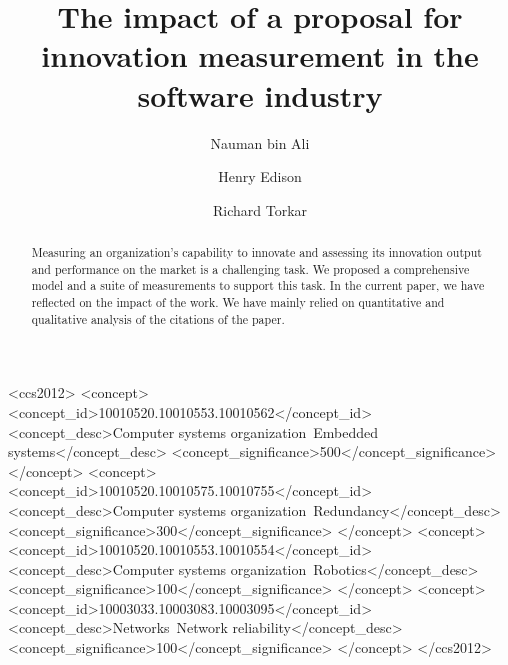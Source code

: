 \documentclass[sigplan]{acmart}
\begin{document}
\title{The impact of a proposal for innovation measurement in the software industry}

\author{Nauman bin Ali}

\author{Henry Edison}

\author{Richard Torkar}


\renewcommand{\shortauthors}{Ali et al.}




\begin{abstract}
Measuring an organization's capability to innovate and assessing its innovation output and performance on the market is a challenging task. We proposed a comprehensive model and a suite of measurements to support this task. In the current paper, we have reflected on the impact of the work. We have mainly relied on quantitative and qualitative analysis of the citations of the paper.  
\end{abstract}

\begin{CCSXML}
<ccs2012>
 <concept>
  <concept_id>10010520.10010553.10010562</concept_id>
  <concept_desc>Computer systems organization~Embedded systems</concept_desc>
  <concept_significance>500</concept_significance>
 </concept>
 <concept>
  <concept_id>10010520.10010575.10010755</concept_id>
  <concept_desc>Computer systems organization~Redundancy</concept_desc>
  <concept_significance>300</concept_significance>
 </concept>
 <concept>
  <concept_id>10010520.10010553.10010554</concept_id>
  <concept_desc>Computer systems organization~Robotics</concept_desc>
  <concept_significance>100</concept_significance>
 </concept>
 <concept>
  <concept_id>10003033.10003083.10003095</concept_id>
  <concept_desc>Networks~Network reliability</concept_desc>
  <concept_significance>100</concept_significance>
 </concept>
</ccs2012>
\end{CCSXML}
\end{document}
